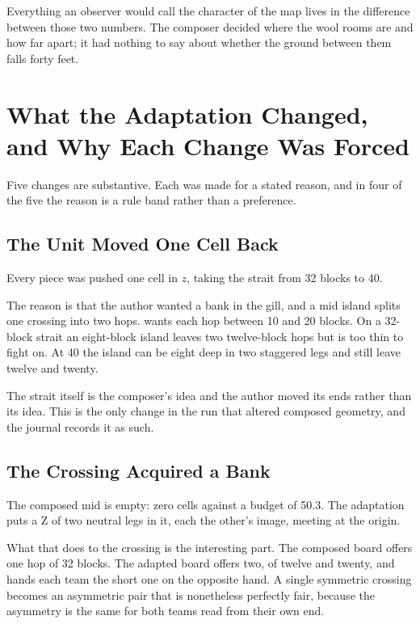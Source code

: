 Everything an observer would call the character of the map lives in the
difference between those two numbers. The composer decided where the wool rooms
are and how far apart; it had nothing to say about whether the ground between
them falls forty feet.

\section{What the Adaptation Changed, and Why Each Change Was Forced}

Five changes are substantive. Each was made for a stated reason, and in four of
the five the reason is a rule band rather than a preference.

\subsection{The Unit Moved One Cell Back}

Every piece was pushed one cell in $z$, taking the strait from 32 blocks to 40.

The reason is that the author wanted a bank in the gill, and a mid island splits
one crossing into two hops.  wants each hop between 10 and 20 blocks. On
a 32-block strait an eight-block island leaves two twelve-block hops but is too
thin to fight on. At 40 the island can be eight deep in two staggered legs and
still leave twelve and twenty.

The strait itself is the composer's idea and the author moved its ends rather
than its idea. This is the only change in the run that altered composed
geometry, and the journal records it as such.

\subsection{The Crossing Acquired a Bank}

The composed mid is empty: zero cells against a budget of 50.3. The adaptation
puts a Z of two neutral legs in it, each the other's  image,
meeting at the origin.

What that does to the crossing is the interesting part. The composed board
offers one hop of 32 blocks. The adapted board offers two, of twelve and twenty,
and  hands each team the short one on the opposite hand. A single
symmetric crossing becomes an asymmetric pair that is nonetheless perfectly
fair, because the asymmetry is the same for both teams read from their own end.

